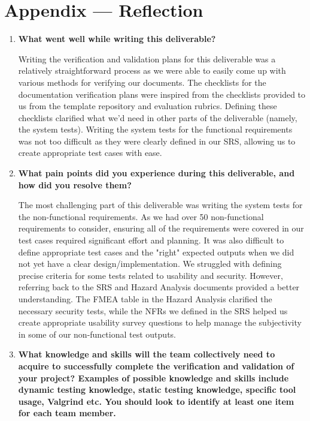\documentclass[12pt, titlepage]{article}
\begin{document}
\newpage{}
\section*{Appendix --- Reflection}

% 

\begin{enumerate}
  \item \textbf{What went well while writing this deliverable?}
  
    Writing the verification and validation plans for this deliverable was a
    relatively straightforward process as we were able to easily come up with
    various methods for verifying our documents. The checklists for the
    documentation verification plans were inspired from the checklists provided
    to us from the template repository and evaluation rubrics. Defining these
    checklists clarified what we'd need in other parts of the deliverable
    (namely, the system tests). Writing the system tests for the functional
    requirements was not too difficult as they were clearly defined in our SRS,
    allowing us to create appropriate test cases with ease. 
  
  \smallskip
  \item \textbf{What pain points did you experience during this deliverable, and
  how did you resolve them?}

  The most challenging part of this deliverable was writing the system tests
  for the non-functional requirements. As we had over 50 non-functional
  requirements to consider, ensuring all of the requirements were covered in our
  test cases required significant effort and planning. It was also difficult to
  define appropriate test cases and the "right" expected outputs when we did not
  yet have a clear design/implementation. We struggled with defining precise
  criteria for some tests related to usability and security. However, referring
  back to the SRS and Hazard Analysis documents provided a better understanding.
  The FMEA table in the Hazard Analysis clarified the necessary security tests,
  while the NFRs we defined in the SRS helped us create appropriate usability
  survey questions to help manage the subjectivity in some of our non-functional
  test outputs.
    
  \smallskip
  \item \textbf{What knowledge and skills will the team collectively need to
  acquire to successfully complete the verification and validation of your
  project? Examples of possible knowledge and skills include dynamic testing
  knowledge, static testing knowledge, specific tool usage, Valgrind etc.  You
  should look to identify at least one item for each team member.}
  

\end{enumerate}
\end{document}
